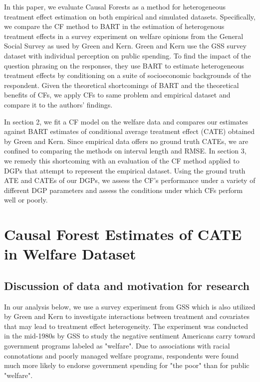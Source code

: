 \documentclass[12pt]{article}
\begin{document}
In this paper, we evaluate Causal Forests as a method for heterogeneous
treatment effect estimation on both empirical and simulated datasets.
Specifically, we compare the CF method to BART in the estimation of heterogenous
treatment effects in a survey experiment on welfare opinions from the General
Social Survey as used by Green and Kern. Green and Kern use the GSS survey dataset with individual perception on public spending. To find the impact of the question phrasing on the responses, they use BART to estimate heterogeneous treatment effects by conditioning on a suite of socioeconomic backgrounds of the respondent. Given
the theoretical shortcomings of BART and the theoretical benefits of CFs, we
apply CFs to same problem and empirical dataset and compare it to the authors'
findings.

In section 2, we fit a CF model on the welfare data and compares our estimates against BART estimates of conditional average treatment effect (CATE) obtained by Green and Kern. Since empirical data offers no ground truth CATEs, we are confined to comparing the methods on interval length and RMSE. In section 3, we remedy this shortcoming with an evaluation of the CF method applied to DGPs that attempt to represent the empirical dataset. Using the ground truth ATE and CATEs of our DGPs, we assess the CF's performance under a variety of different DGP parameters and assess the conditions under which CFs perform well or poorly.
\\ 

\section{Causal Forest Estimates of CATE in Welfare Dataset} 

\subsection{Discussion of data and motivation for research} 
In our analysis below, we use a survey experiment from GSS which is also utilized by Green and Kern to investigate interactions between treatment and covariates that may lead to treatment effect heterogeneity. The experiment was conducted in the mid-1980s by GSS to study the negative sentiment Americans carry toward government programs labeled as "welfare". Due to associations with racial connotations and poorly managed welfare programs, respondents were found much more likely to endorse government spending for "the poor" than for public "welfare".~\cite{rasinski1989}\\
\end{document}
